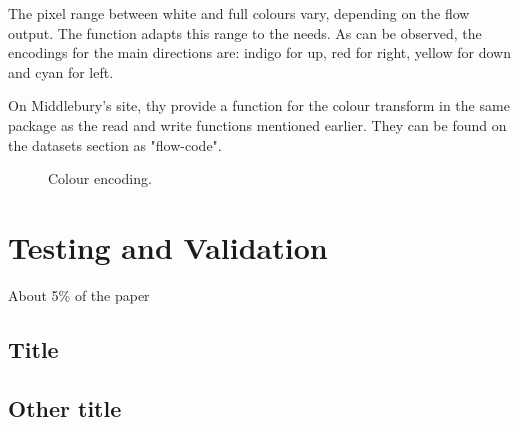 \documentclass[12pt,a4paper,twoside]{report}
\begin{document}
{ The pixel range between white and full colours vary, depending on the flow output. The function adapts this range to the needs. As can be observed, the encodings for the main directions are: indigo for up, red for right, yellow for down and cyan for left.
 
 
  On Middlebury's site, thy provide a function for the colour transform in the same package as the read and write functions mentioned earlier. They can be found on the datasets section as "flow-code".  

\begin{figure}
	\label{colors}
	\centering
	\caption{Colour encoding.}
\end{figure}


\chapter{Testing and Validation}

About 5\% of the paper
\section{Title}
\section{Other title}
}
\end{document}
